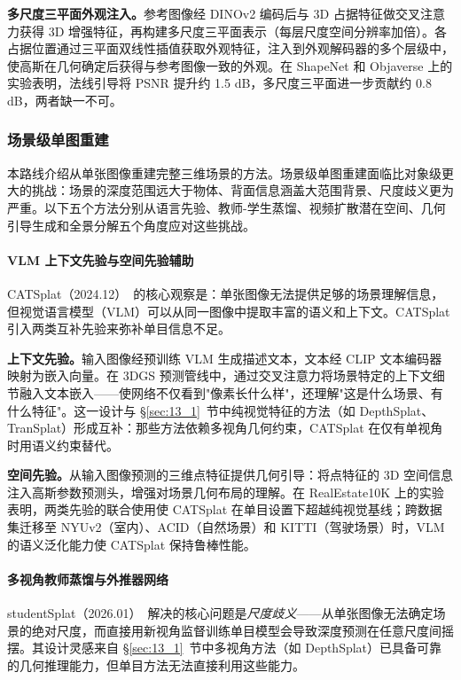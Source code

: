 \textbf{多尺度三平面外观注入。}参考图像经 DINOv2 编码后与 3D 占据特征做交叉注意力获得 3D 增强特征，再构建多尺度三平面表示（每层尺度空间分辨率加倍）。各占据位置通过三平面双线性插值获取外观特征，注入到外观解码器的多个层级中，使高斯在几何确定后获得与参考图像一致的外观。在 ShapeNet 和 Objaverse 上的实验表明，法线引导将 PSNR 提升约 1.5 dB，多尺度三平面进一步贡献约 0.8 dB，两者缺一不可。

\subsubsection{场景级单图重建}

本路线介绍从单张图像重建完整三维场景的方法。场景级单图重建面临比对象级更大的挑战：场景的深度范围远大于物体、背面信息涵盖大范围背景、尺度歧义更为严重。以下五个方法分别从语言先验、教师-学生蒸馏、视频扩散潜在空间、几何引导生成和全景分解五个角度应对这些挑战。

\paragraph{VLM 上下文先验与空间先验辅助}

CATSplat（2024.12）~\cite{2412_12906}的核心观察是：单张图像无法提供足够的场景理解信息，但视觉语言模型（VLM）可以从同一图像中提取丰富的语义和上下文。CATSplat 引入两类互补先验来弥补单目信息不足。

\textbf{上下文先验。}输入图像经预训练 VLM 生成描述文本，文本经 CLIP 文本编码器映射为嵌入向量。在 3DGS 预测管线中，通过交叉注意力将场景特定的上下文细节融入文本嵌入——使网络不仅看到"像素长什么样"，还理解"这是什么场景、有什么特征"。这一设计与 §\ref{sec:13_1}~节中纯视觉特征的方法（如 DepthSplat、TranSplat）形成互补：那些方法依赖多视角几何约束，CATSplat 在仅有单视角时用语义约束替代。

\textbf{空间先验。}从输入图像预测的三维点特征提供几何引导：将点特征的 3D 空间信息注入高斯参数预测头，增强对场景几何布局的理解。在 RealEstate10K 上的实验表明，两类先验的联合使用使 CATSplat 在单目设置下超越纯视觉基线；跨数据集迁移至 NYUv2（室内）、ACID（自然场景）和 KITTI（驾驶场景）时，VLM 的语义泛化能力使 CATSplat 保持鲁棒性能。

\paragraph{多视角教师蒸馏与外推器网络}

studentSplat（2026.01）~\cite{2601_11772}解决的核心问题是\emph{尺度歧义}——从单张图像无法确定场景的绝对尺度，而直接用新视角监督训练单目模型会导致深度预测在任意尺度间摇摆。其设计灵感来自 §\ref{sec:13_1}~节中多视角方法（如 DepthSplat）已具备可靠的几何推理能力，但单目方法无法直接利用这些能力。

